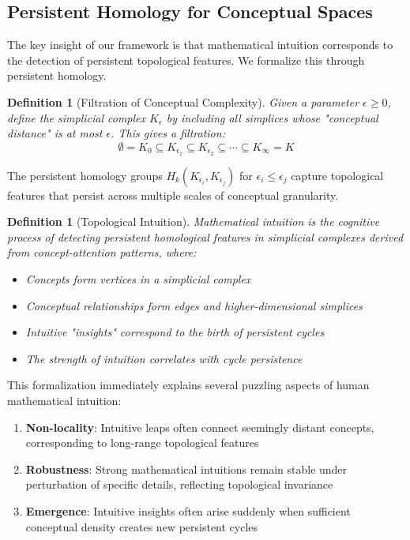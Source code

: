 \documentclass[11pt]{article}
\newtheorem{definition}[theorem]{Definition}
\begin{document}
\subsection{Persistent Homology for Conceptual Spaces}

The key insight of our framework is that mathematical intuition corresponds to the detection of persistent topological features. We formalize this through persistent homology.

\begin{definition}[Filtration of Conceptual Complexity]
Given a parameter $\epsilon \geq 0$, define the simplicial complex $K_\epsilon$ by including all simplices whose "conceptual distance" is at most $\epsilon$. This gives a filtration:
$$\emptyset = K_0 \subseteq K_{\epsilon_1} \subseteq K_{\epsilon_2} \subseteq \cdots \subseteq K_\infty = K$$
\end{definition}

The persistent homology groups $H_k(K_{\epsilon_i}, K_{\epsilon_j})$ for $\epsilon_i \leq \epsilon_j$ capture topological features that persist across multiple scales of conceptual granularity.

\begin{definition}[Topological Intuition]
Mathematical intuition is the cognitive process of detecting persistent homological features in simplicial complexes derived from concept-attention patterns, where:
\begin{itemize}
\item Concepts form vertices in a simplicial complex
\item Conceptual relationships form edges and higher-dimensional simplices  
\item Intuitive "insights" correspond to the birth of persistent cycles
\item The strength of intuition correlates with cycle persistence
\end{itemize}
\end{definition}

This formalization immediately explains several puzzling aspects of human mathematical intuition:

\begin{enumerate}
\item \textbf{Non-locality}: Intuitive leaps often connect seemingly distant concepts, corresponding to long-range topological features
\item \textbf{Robustness}: Strong mathematical intuitions remain stable under perturbation of specific details, reflecting topological invariance
\item \textbf{Emergence}: Intuitive insights often arise suddenly when sufficient conceptual density creates new persistent cycles
\end{enumerate}
\end{document}
